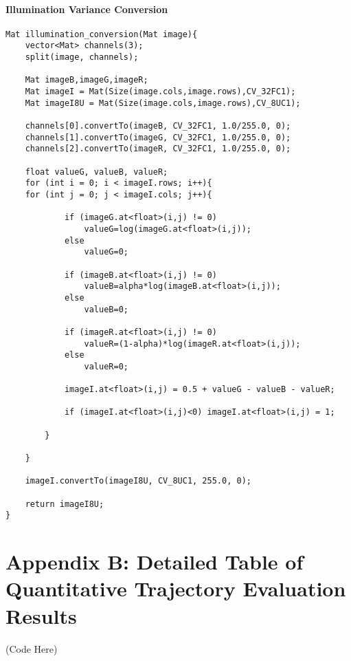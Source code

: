 \subsubsection{Illumination Variance Conversion}

\begin{lstlisting}[style=CStyle]
Mat illumination_conversion(Mat image){
	vector<Mat> channels(3);
	split(image, channels);
	
	Mat imageB,imageG,imageR;
	Mat imageI = Mat(Size(image.cols,image.rows),CV_32FC1);
	Mat imageI8U = Mat(Size(image.cols,image.rows),CV_8UC1);
	
	channels[0].convertTo(imageB, CV_32FC1, 1.0/255.0, 0);
	channels[1].convertTo(imageG, CV_32FC1, 1.0/255.0, 0);
	channels[2].convertTo(imageR, CV_32FC1, 1.0/255.0, 0);
	
	float valueG, valueB, valueR;
	for (int i = 0; i < imageI.rows; i++){
	for (int j = 0; j < imageI.cols; j++){
	
			if (imageG.at<float>(i,j) != 0)
				valueG=log(imageG.at<float>(i,j));
			else
				valueG=0;
			
			if (imageB.at<float>(i,j) != 0)
				valueB=alpha*log(imageB.at<float>(i,j));
			else
				valueB=0;
			
			if (imageR.at<float>(i,j) != 0)
				valueR=(1-alpha)*log(imageR.at<float>(i,j));
			else
				valueR=0;
			
			imageI.at<float>(i,j) = 0.5 + valueG - valueB - valueR;
			
			if (imageI.at<float>(i,j)<0) imageI.at<float>(i,j) = 1;
			
		}
	
	}
	
	imageI.convertTo(imageI8U, CV_8UC1, 255.0, 0);
	
	return imageI8U;
}
\end{lstlisting}

\chapter*{Appendix B: Detailed Table of Quantitative Trajectory Evaluation Results}
(Code Here)


\newpage
